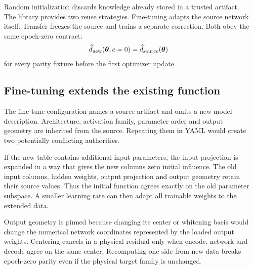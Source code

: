 \documentclass[10pt,aps,prd,twocolumn,nofootinbib]{revtex4-2}
\newcommand{\btheta}{\boldsymbol{\theta}}
\begin{document}
Random initialization discards knowledge already stored in a trusted
artifact.  The library provides two reuse strategies.  Fine-tuning adapts the
source network itself.  Transfer freezes the source and trains a separate
correction.  Both obey the same epoch-zero contract:
\begin{equation*}
 \widehat d_{\rm new}(\btheta,e=0)
 =
 \widehat d_{\rm source}(\btheta)
\end{equation*}
for every parity fixture before the first optimizer update.

\subsection{Fine-tuning extends the existing function}

The fine-tune configuration names a source artifact and omits a new model
description.  Architecture, activation family, parameter order and output
geometry are inherited from the source.  Repeating them in YAML would create
two potentially conflicting authorities.

If the new table contains additional input parameters, the input projection
is expanded in a way that gives the new columns zero initial influence.  The
old input columns, hidden weights, output projection and output geometry
retain their source values.  Thus the initial function agrees exactly on the
old parameter subspace.  A smaller learning rate can then adapt all trainable
weights to the extended data.

Output geometry is pinned because changing its center or whitening basis would
change the numerical network coordinates represented by the loaded output
weights.  Centering cancels in a physical residual only when encode, network
and decode agree on the same center.  Recomputing one side from new data breaks
epoch-zero parity even if the physical target family is unchanged.
\end{document}
